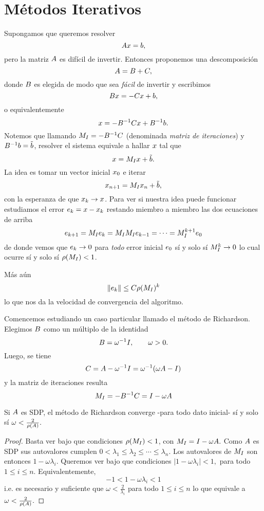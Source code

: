 \section{Métodos Iterativos}
Supongamos que queremos resolver
$$
\Ab\xb=\bb,
$$
pero la matriz $\Ab$ es difícil de invertir. Entonces proponemos una descomposición
$$\Ab=\Bb+\Cb,$$
donde $\Bb$ es elegida de modo que sea \emph{fácil} de invertir y escribimos
$$
\Bb\xb=-\Cb\xb+\bb,
$$
o equivalentemente
$$
\xb=-\Bb^{-1}\Cb\xb+\Bb^{-1}\bb.
$$
Notemos que llamando $\Mb_I=-\Bb^{-1}\Cb$  (denominada \emph{matriz de iteraciones}) y $\Bb^{-1}\bb=\tilde{\bb}$,  resolver el sistema equivale a hallar $\xb$ tal que
$$
\xb=\Mb_I\xb+\tilde{\bb}.
$$
La idea es tomar un vector inicial $\xb_0$ e iterar
$$
\xb_{n+1}=\Mb_I\xb_n+\tilde{\bb},
$$
con la esperanza de que $\xb_k\to \xb$. Para ver si nuestra idea puede funcionar estudiamos el error $\eb_k=\xb-\xb_k$ restando miembro a miembro las dos ecuaciones de arriba
$$
\eb_{k+1}=\Mb_I\eb_k=\Mb_I\Mb_I\eb_{k-1}=\cdots = \Mb^{k+1}_I\eb_0
$$
de donde vemos que $\eb_k\to \cero$ para \emph{todo} error inicial $\eb_0$ sí y solo sí
$\Mb_I^{k}\to \cero $ lo cual ocurre sí y solo sí $\rho(\Mb_I)<1$.

Más aún
$$
\|\eb_k\|\le C\rho(\Mb_I)^k
$$
lo que nos da la velocidad de convergencia del algoritmo.

Comencemos estudiando un caso particular llamado el método de Richardson.
 Elegimos $\Bb$ como un múltiplo de la identidad
$$\Bb=\omega^{-1}\Ib, \qquad \omega>0.$$
Luego, se tiene
$$\Cb=\Ab-\omega^{-1}\Ib=\omega^{-1}(\omega\Ab-\Ib)$$
y la matriz de iteraciones resulta
$$
\Mb_I=-\Bb^{-1}\Cb=
\Ib-\omega\Ab
$$

\tcc
\begin{prop}
Si $\Ab$ es SDP, el método de Richardson converge -para todo dato inicial- sí y solo sí $\omega<\frac{2}{\rho(\Ab)}.$
\end{prop}
\etcc

\begin{proof}
 Basta ver bajo que condiciones $\rho(\Mb_I)<1$, con $
\Mb_I=
\Ib-\omega\Ab.
$ Como $\Ab$ es SDP sus autovalores cumplen $0<\lambda_1\le \lambda_2\le \cdots \le \lambda_n$. Los autovalores de $
\Mb_I$ son entonces $1-\omega\lambda_i$.  Queremos ver bajo que condiciones
$
|1-\omega\lambda_i|<1,
$ para todo $1\le i\le n$. Equivalentemente,
$$
-1< 1-\omega\lambda_i< 1
$$
i.e. es necesario y suficiente que $\omega<\frac{2}{\lambda_i}$ para todo $1\le i\le n$ lo que equivale a
$\omega<\frac{2}{\rho(\Ab)}.$
\end{proof}

